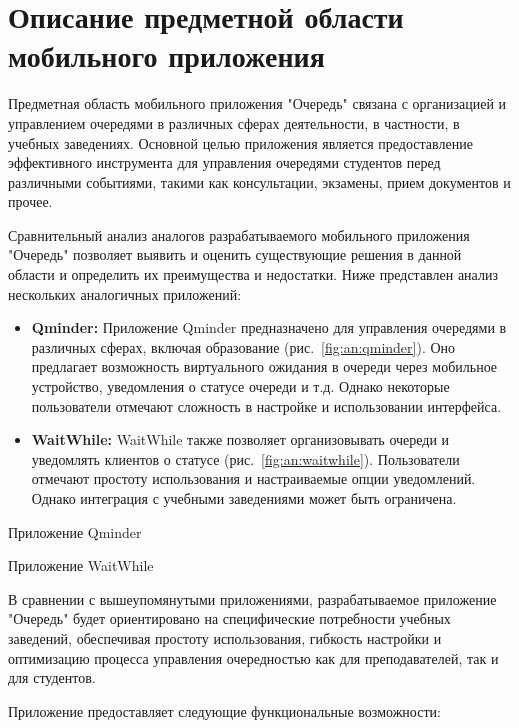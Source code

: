
\section{Описание предметной области мобильного приложения}

Предметная область мобильного приложения "Очередь" связана с организацией
и управлением очередями в различных сферах деятельности, в частности,
в учебных заведениях. Основной целью приложения является предоставление
эффективного инструмента для управления очередями студентов перед различными
событиями, такими как консультации, экзамены, прием документов и прочее.

Сравнительный анализ аналогов разрабатываемого мобильного приложения "Очередь"
позволяет выявить и оценить существующие решения в данной области
и определить их преимущества и недостатки.
Ниже представлен анализ нескольких аналогичных приложений:

\begin{itemize}
	\item \textbf{Qminder:} Приложение Qminder предназначено
		для управления очередями в различных сферах,
		включая образование (рис.~\ref{fig:an:qminder}).
		Оно предлагает возможность виртуального ожидания
		в очереди через мобильное устройство,
		уведомления о статусе очереди и т.д.
		Однако некоторые пользователи отмечают сложность в настройке
		и использовании интерфейса.
	\item \textbf{WaitWhile:} WaitWhile также позволяет организовывать
		очереди и уведомлять клиентов о статусе (рис.~\ref{fig:an:waitwhile}).
		Пользователи отмечают простоту использования
		и настраиваемые опции уведомлений.
		Однако интеграция с учебными заведениями может быть ограничена.
\end{itemize}

\begin{image}
	\caption{Приложение Qminder}
	\label{fig:an:qminder}
\end{image}

\begin{image}
	\caption{Приложение WaitWhile}
	\label{fig:an:waitwhile}
\end{image}

В сравнении с вышеупомянутыми приложениями,
разрабатываемое приложение "Очередь" будет ориентировано
на специфические потребности учебных заведений,
обеспечивая простоту использования, гибкость настройки
и оптимизацию процесса управления очередностью как для преподавателей,
так и для студентов.\par
Приложение предоставляет следующие функциональные возможности:


